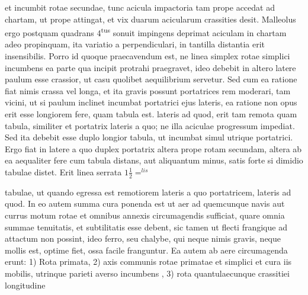      et incumbit rotae\protect{} secundae, tunc acicula impactoria tam prope accedat ad chartam, ut prope attingat, et vix duarum acicularum crassities desit. Malleolus ergo postquam quadrans 4\textsuperscript{tus} sonuit impingens  deprimat aciculam in chartam adeo propinquam, ita variatio a perpendiculari, in tantilla distantia erit insensibilis. Porro id quoque praecavendum est, ne linea simplex rotae\protect{} simplici incumbens ea parte qua incipit protrahi praegravet, ideo debebit in altero latere paulum esse crassior, ut casu quolibet aequilibrium\protect{} servetur. Sed cum ea ratione fiat nimis crassa vel longa, et ita gravis possunt portatrices rem moderari, tam vicini, ut si paulum inclinet incumbat portatrici ejus lateris, ea ratione non opus erit esse longiorem fere, quam tabula est.  lateris ad quod, erit tam remota quam tabula, similiter et portatrix lateris a quo; ne illa aciculae progressum impediat. Sed ita debebit esse duplo longior tabula, ut incumbat simul utrique portatrici. Ergo fiat in latere a quo duplex portatrix altera prope rotam\protect{} secundam, altera ab ea aequaliter fere cum tabula distans, aut aliquantum minus, satis forte si dimidio tabulae distet. Erit linea serrata $\displaystyle1\frac{1}{2}=^{lis}$\rule[-4mm]{0mm}{10mm} tabulae, ut quando egressa est remotiorem lateris a quo portatricem,  lateris ad quod. In eo autem summa cura ponenda est ut aer ad quemcunque navis\protect{} aut currus motum rotae\protect{} et omnibus annexis circumagendis sufficiat, quare omnia summae tenuitatis, et subtilitatis esse debent, sic tamen ut flecti frangique ad attactum non possint, ideo ferro, seu chalybe, qui neque nimis gravis, neque mollis est, optime fiet,  ossa facile franguntur. Ea autem ab aere circumagenda erunt: 1) Rota\protect{} primata, 2) axis communis rotae\protect{} primatae et simplici et cura iis mobilis, utrinque parieti averso incumbens , 3) rota\protect{}  quantulaecunque crassitiei longitudine\protect{} 